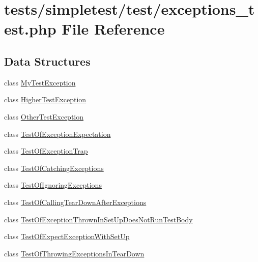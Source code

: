 \hypertarget{exceptions__test_8php}{\section{tests/simpletest/test/exceptions\-\_\-test.php File Reference}
\label{exceptions__test_8php}
}
\subsection*{Data Structures}
\begin{DoxyCompactItemize}
\item 
class \hyperlink{class_my_test_exception}{My\-Test\-Exception}
\item 
class \hyperlink{class_higher_test_exception}{Higher\-Test\-Exception}
\item 
class \hyperlink{class_other_test_exception}{Other\-Test\-Exception}
\item 
class \hyperlink{class_test_of_exception_expectation}{Test\-Of\-Exception\-Expectation}
\item 
class \hyperlink{class_test_of_exception_trap}{Test\-Of\-Exception\-Trap}
\item 
class \hyperlink{class_test_of_catching_exceptions}{Test\-Of\-Catching\-Exceptions}
\item 
class \hyperlink{class_test_of_ignoring_exceptions}{Test\-Of\-Ignoring\-Exceptions}
\item 
class \hyperlink{class_test_of_calling_tear_down_after_exceptions}{Test\-Of\-Calling\-Tear\-Down\-After\-Exceptions}
\item 
class \hyperlink{class_test_of_exception_thrown_in_set_up_does_not_run_test_body}{Test\-Of\-Exception\-Thrown\-In\-Set\-Up\-Does\-Not\-Run\-Test\-Body}
\item 
class \hyperlink{class_test_of_expect_exception_with_set_up}{Test\-Of\-Expect\-Exception\-With\-Set\-Up}
\item 
class \hyperlink{class_test_of_throwing_exceptions_in_tear_down}{Test\-Of\-Throwing\-Exceptions\-In\-Tear\-Down}
\end{DoxyCompactItemize}
